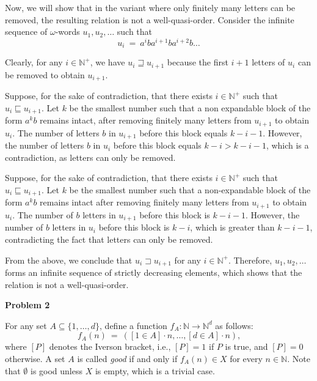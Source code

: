 \documentclass[12pt]{article}
\begin{document}
	\medskip
	
	Now, we will show that in the variant where only finitely many letters can
	be removed, the resulting relation is not a well-quasi-order. Consider the
	infinite sequence of \(\omega\)-words \(u_{1}, u_{2}, \ldots\) such that
	\[ u_{i} \ = \ a^{i} b a^{i + 1} b a^{i + 2} b \ldots \]
	
	Clearly, for any \(i \in \mathbb{N}^{+}\), we have \(u_{i} \sqsupseteq
	u_{i + 1}\) because the first \(i + 1\) letters of \(u_{i}\) can be removed
	to obtain \(u_{i + 1}\).
	
	\medskip
	
	Suppose, for the sake of contradiction, that there exists \(i \in
	\mathbb{N}^{+}\) such that \(u_{i} \sqsubseteq u_{i + 1}\). Let \(k\) be the
	smallest number such that a non expandable block of the form \(a^{k} b\)
	remains intact, after removing finitely many letters from \(u_{i + 1}\) to
	obtain \(u_{i}\). The number of letters \(b\) in \(u_{i + 1}\) before this
	block equals \(k - i - 1\). However, the number of letters \(b\) in
	\(u_{i}\) before this block equals \(k - i > k - i - 1\), which is a
	contradiction, as letters can only be removed.
	
	\medskip
	
	Suppose, for the sake of contradiction, that there exists \(i \in
	\mathbb{N}^{+}\) such that \(u_{i} \sqsubseteq u_{i + 1}\). Let \(k\) be the
	smallest number such that a non-expandable block of the form \(a^{k} b\)
	remains intact after removing finitely many letters from \(u_{i + 1}\) to
	obtain \(u_{i}\). The number of \(b\) letters in \(u_{i + 1}\) before this
	block is \(k - i - 1\). However, the number of \(b\) letters in \(u_{i}\)
	before this block is \(k - i\), which is greater than \(k - i - 1\),
	contradicting the fact that letters can only be removed.
	
	\medskip
	
	From the above, we conclude that \(u_{i} \sqsupset u_{i + 1}\) for any \(i
	\in \mathbb{N}^{+}\). Therefore, \(u_{1}, u_{2}, \ldots\) forms an infinite
	sequence of strictly decreasing elements, which shows that the relation is
	not a well-quasi-order.
	
	\newpage
	
	\textbf{Problem 2}
	
	\medskip
	
	For any set \(A \subseteq \{1, \ldots, d\}\), define a function \(f_{A} :
	\mathbb{N} \to \mathbb{N}^{d}\) as follows:
	\[ f_{A}(n) \ = \ ([1 \in A] \cdot n, \ldots, [d \in A] \cdot n) \text{,} \]
	where \([P]\) denotes the Iverson bracket, i.e., \([P] = 1\) if \(P\) is
	true, and \([P] = 0\) otherwise. A set \(A\) is called \textit{good} if and
	only if \(f_{A}(n) \in X\) for every \(n \in \mathbb{N}\). Note that
	\(\emptyset\) is good unless \(X\) is empty, which is a trivial case.
	
\end{document}
